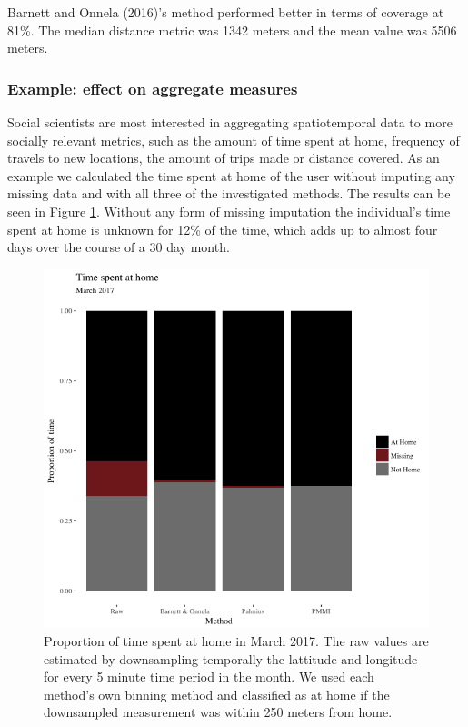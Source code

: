 \documentclass[man]{apa6}
\theoremstyle{definition}
\theoremstyle{definition}
\theoremstyle{definition}
\theoremstyle{remark}
\begin{document}
Barnett and Onnela (2016)'s method performed better in terms of coverage
at 81\%. The median distance metric was 1342 meters and the mean value
was 5506 meters.

\subsubsection{Example: effect on aggregate
measures}\label{example-effect-on-aggregate-measures}

Social scientists are most interested in aggregating spatiotemporal data
to more socially relevant metrics, such as the amount of time spent at
home, frequency of travels to new locations, the amount of trips made or
distance covered. As an example we calculated the time spent at home of
the user without imputing any missing data and with all three of the
investigated methods. The results can be seen in Figure
\ref{fig:aggrePlot}. Without any form of missing imputation the
individual's time spent at home is unknown for 12\% of the time, which
adds up to almost four days over the course of a 30 day month.

\begin{figure}
\includegraphics[width=1\linewidth]{img/timeUse} \caption{Proportion of time spent at home in March 2017. The raw values are estimated by downsampling temporally the lattitude and longitude for every 5 minute time period in the month. We used each method's own binning method and classified as at home if the downsampled measurement was within 250 meters from home.}\label{fig:aggrePlot}
\end{figure}
\end{document}
